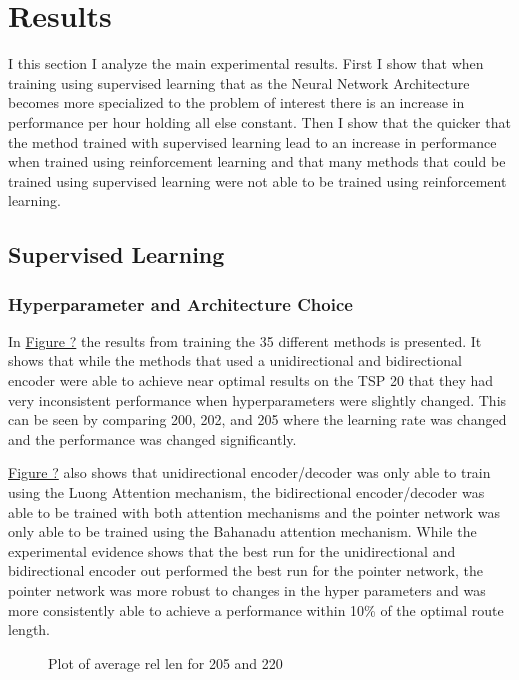 \documentclass[12pt]{article}
\begin{document}

\section{Results}

I this section I analyze the main experimental results. First I show that when training using supervised learning that as the Neural Network Architecture becomes more specialized to the problem of interest there is an increase in performance per hour holding all else constant. Then I show that the quicker that the method trained with supervised learning lead to an increase in performance when trained using reinforcement learning and that many methods that could be trained using supervised learning were not able to be trained using reinforcement learning.

\subsection{Supervised Learning}

\subsubsection{Hyperparameter and Architecture Choice}

In \hyperref[fig_sl_table]{Figure ?} the results from training the 35 different methods is presented. It shows that while the methods that used a unidirectional and bidirectional encoder were able to achieve near optimal results on the TSP 20 that they had very inconsistent performance when hyperparameters were slightly changed. This can be seen by comparing 200, 202, and 205 where the learning rate was changed and the performance was changed significantly.

\hyperref[fig_sl_table]{Figure ?} also shows that unidirectional encoder/decoder was only able to train using the Luong Attention mechanism, the bidirectional encoder/decoder was able to be trained with both attention mechanisms and the pointer network was only able to be trained using the Bahanadu attention mechanism. While the experimental evidence shows that the best run for the unidirectional and bidirectional encoder out performed the best run for the pointer network, the pointer network was more robust to changes in the hyper parameters and was more consistently able to achieve a performance within 10\% of the optimal route length.

\begin{figure}[H]
  \centering
  \caption{Plot of average rel len for 205 and 220}
  \label{fig_sr_trainrate}
\end{figure}
\end{document}
